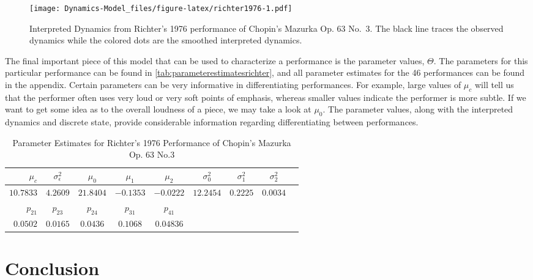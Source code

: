 \documentclass[12pt]{article}
\begin{document}
\begin{figure}
\centering
\texttt{[image: Dynamics-Model\_files/figure-latex/richter1976-1.pdf]}
\caption{\label{fig:richter1976}Interpreted Dynamics from Richter's 1976
performance of Chopin's Mazurka Op. 63 No.~3. The black line traces the
observed dynamics while the colored dots are the smoothed interpreted
dynamics.}
\end{figure}

The final important piece of this model that can be used to characterize
a performance is the parameter values, \(\Theta\). The parameters for
this particular performance can be found in
\autoref{tab:parameterestimatesrichter}, and all parameter estimates for
the 46 performances can be found in the appendix. Certain parameters can
be very informative in differentiating performances. For example, large
values of \(\mu_c\) will tell us that the performer often uses very loud
or very soft points of emphasis, whereas smaller values indicate the
performer is more subtle. If we want to get some idea as to the overall
loudness of a piece, we may take a look at \(\mu_0\). The parameter
values, along with the interpreted dynamics and discrete state, provide
considerable information regarding differentiating between performances.

\begin{table}[t]
  \centering
  \begin{tabular}{@{}rcccccccc@{}}
    \toprule
    $\mu_c$ & $\sigma^2_{\epsilon}$ & $\mu_{0}$ & $\mu_{1}$ & $\mu_{2}$ & $\sigma^2_{0} $ & $\sigma^2_{1} $ & $\sigma^2_{2}$ \\
    \midrule
    $10.7833$ & $4.2609$ & $21.8404$ & $-0.1353$ & $-0.0222$ & $12.2454$ & $0.2225$ & $0.0034$ \\
    \midrule
    $p_{21}$ & $p_{23}$ & $p_{24}$ & $p_{31}$ & $p_{41}$ \\
    \midrule
    $0.0502$ & $0.0165$ & $0.0436$ & $0.1068$ & $0.04836$ \\
    \bottomrule
  \end{tabular}
  \caption{Parameter Estimates for Richter's 1976 Performance of Chopin's Mazurka Op. 63 No.3}
  \label{tab:parameterestimatesrichter}
\end{table}

\section{Conclusion}
\label{sec:conclusion}

\nocite{*}



\end{document}
